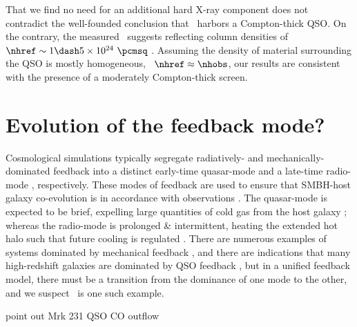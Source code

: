 \documentclass[useAMS,usenatbib]{mn2e}
\begin{document}
That we find no need for an additional hard X-ray component does not
contradict the well-founded conclusion that \irs\ harbors a
Compton-thick QSO. On the contrary, the measured \fekaew\ suggests
reflecting column densities of $\nhref \sim 1 \dash 5 \times 10^{24}
~\pcmsq$ \citep{1993MNRAS.263..314L, 2005A&A...444..119G,
  2010arXiv1005.3253C}. Assuming the density of material surrounding
the QSO is mostly homogeneous, \ie\ $\nhref \approx \nhobs$, our
results are consistent with the presence of a moderately Compton-thick
screen.

\section{Evolution of the feedback mode?}
\label{sec:evo}

Cosmological simulations typically segregate radiatively- and
mechanically-dominated feedback into a distinct early-time quasar-mode
\citep[\eg][]{2005Natur.435..629S} and a late-time radio-mode
\citep[\eg][]{croton06}, respectively. These modes of feedback are
used to ensure that SMBH-host galaxy co-evolution is in accordance
with observations \citep[\eg][]{magorrian}. The quasar-mode is
expected to be brief, expelling large quantities of cold gas from the
host galaxy \citep{2006ApJ...642L.107N}; whereas the radio-mode is
prolonged \& intermittent, heating the extended hot halo such that
future cooling is regulated \citep[see][for a review]{mcnamrev}. There
are numerous examples of systems dominated by mechanical feedback
\citep[\eg][]{perseus1, ms0735}, and there are indications that many
high-redshift galaxies are dominated by QSO feedback \citep[see][for a
  review]{2005ARA&A..43..769V}, but in a unified feedback model, there
must be a transition from the dominance of one mode to the other, and
we suspect \irs\ is one such example.

point out Mrk 231 QSO CO outflow \citep{2010arXiv1006.1655F}
\end{document}
